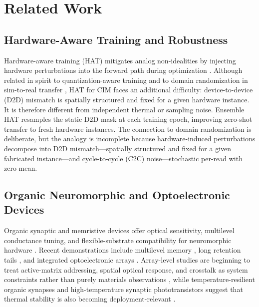 \section{Related Work}
\label{sec:related-work}

\subsection{Hardware-Aware Training and Robustness}

Hardware-aware training (HAT) mitigates analog non-idealities by injecting hardware perturbations into the forward path during optimization \citep{joshi2020accurate}. Although related in spirit to quantization-aware training \citep{choi2019pact} and to domain randomization in sim-to-real transfer \citep{tobin2017domain}, HAT for CIM faces an additional difficulty: device-to-device (D2D) mismatch is spatially structured and fixed for a given hardware instance. It is therefore different from independent thermal or sampling noise. Ensemble HAT resamples the static D2D mask at each training epoch, improving zero-shot transfer to fresh hardware instances. The connection to domain randomization is deliberate, but the analogy is incomplete because hardware-induced perturbations decompose into D2D mismatch---spatially structured and fixed for a given fabricated instance---and cycle-to-cycle (C2C) noise---stochastic per-read with zero mean.

\subsection{Organic Neuromorphic and Optoelectronic Devices}
\label{subsec:organic-devices}

Organic synaptic and memristive devices offer optical sensitivity, multilevel conductance tuning, and flexible-substrate compatibility for neuromorphic hardware \citep{xu2025emerging,photonics2025organicreview,beller2024organicneurons,ji2025singleoectneuron}. Recent demonstrations include multilevel memory \citep{guo2024organic,jung2024organicfilaments}, long retention tails \citep{zeng2023organicmemristor}, and integrated optoelectronic arrays \citep{gebregiorgis2023organiccim,liu2026opect,zhang2025mooptoelectronic,cui2025multimode}. Array-level studies are beginning to treat active-matrix addressing, spatial optical response, and crosstalk as system constraints rather than purely materials observations \citep{visionarch2023crosstalk,amspa2024insensor,jang2023insensor}, while temperature-resilient organic synapses and high-temperature synaptic phototransistors suggest that thermal stability is also becoming deployment-relevant \citep{fuller2020tempresilient,guo2024hightemp}.

